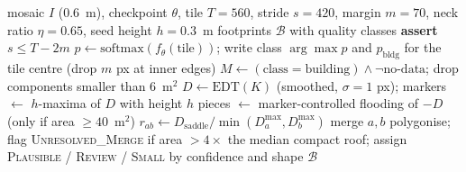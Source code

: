 \documentclass[preprint,12pt]{elsarticle}
\newcommand{\dinoseg}{StrongDINOv2Seg}
\begin{document}
\begin{algorithm}[htbp]
\footnotesize
\caption{Tiled \dinoseg{} inference and distance-transform building extraction (EDT: Euclidean distance transform; $h$-maxima: regional maxima of height $h$ used as seeds) (\texttt{run\_tiled\_inference.py}, \texttt{extract\_buildings\_v8.py})}
\label{alg:extract}
\begin{algorithmic}[1]
\Require mosaic $I$ (0.6~m), checkpoint $\theta$, tile $T=560$, stride $s=420$, margin $m=70$, neck ratio $\eta=0.65$, seed height $h=0.3$~m
\Ensure footprints $\mathcal B$ with quality classes
\State \textbf{assert} $s\le T-2m$ 
  \State $p\gets\mathrm{softmax}(f_\theta(\text{tile}))$; write class $\arg\max p$ and $p_{\mathrm{bldg}}$ for the tile centre (drop $m$ px at inner edges)
\EndFor
\State $M\gets(\text{class}=\text{building})\wedge\lnot\text{no-data}$; drop components smaller than 6~m$^2$
  \State $D\gets\mathrm{EDT}(K)$ (smoothed, $\sigma=1$ px); markers $\gets$ $h$-maxima of $D$ with height $h$
  \State pieces $\gets$ marker-controlled flooding of $-D$ (only if area $\ge 40$~m$^2$)
    \State $r_{ab}\gets D_{\mathrm{saddle}}/\min(D_a^{\max},D_b^{\max})$
     merge $a,b$ 
    \EndIf
  \EndFor
\EndFor
\State polygonise; flag \textsc{Unresolved\_Merge} if area $>4\times$ the median compact roof; assign \textsc{Plausible} / \textsc{Review} / \textsc{Small} by confidence and shape
\State \Return $\mathcal B$
\end{algorithmic}
\end{algorithm}
\end{document}

